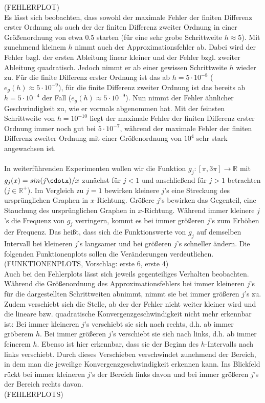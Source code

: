 \documentclass{scrartcl}
\begin{document}
(FEHLERPLOT) \\
Es lässt sich beobachten, dass sowohl der maximale Fehler der finiten Differenz erster Ordnung als auch der der finiten Differenz zweiter Ordnung in einer Größenordnung von etwa $0.5$ starten (für eine sehr grobe Schrittweite $h \approx 5$). Mit zunehmend kleinem $h$ nimmt auch der Approximationsfehler ab. Dabei wird der Fehler bzgl. der ersten Ableitung linear kleiner und der Fehler bzgl. zweiter Ableitung quadratisch. Jedoch nimmt er ab einer gewissen Schrittweite $h$ wieder zu. Für die finite Differenz erster Ordnung ist das ab $h = 5\cdot10^{-8}$ ($e_g(h) \approx  5 \cdot 10^{-9}$), für die finite Differenz zweiter Ordnung ist das bereits ab $h = 5 \cdot 10^{-4}$ der Fall ($e_g(h) \approx  5 \cdot 10^{-9}$). Nun nimmt der Fehler ähnlicher Geschwindigkeit zu, wie er vormals abgenommen hat. Mit der feinsten Schrittweite von $h = 10^{-10}$ liegt der maximale Fehler der finiten Differenz erster Ordnung immer noch gut bei $5 \cdot 10^{-7}$, während der maximale Fehler der finiten Differenz zweiter Ordnung mit einer Größenordnung von $10^{4}$ sehr stark angewachsen ist. \\
 \\
In weiterführenden Experimenten wollen wir die Funktion $g_j:[\pi, 3\pi] \rightarrow \mathbb{R}$ mit $g_j(x) = sin(j\cdotx)/x$ zunächst für $j<1$ und anschließend für $j>1$ betrachten ($j \in \mathbb{R^{+}}$). Im Vergleich zu $j = 1$ bewirken kleinere $j$'s eine Streckung des ursprünglichen Graphen in $x$-Richtung. Größere $j$'s bewirken das Gegenteil, eine Stauchung des ursprünglichen Graphen in $x$-Richtung. Während immer kleinere $j$'s die Frequenz von $g_j$ verringern, kommt es bei immer größeren $j$'s zum Erhöhen der Frequenz. Das heißt, dass sich die Funktionswerte von $g_j$ auf demselben Intervall bei kleineren $j$'s langsamer und bei größeren $j$'s schneller ändern. Die folgenden Funktionenplots sollen die Veränderungen verdeutlichen. \\
(FUNKTIONENPLOTS, Vorschlag: erste 6, erste 4) \\
Auch bei den Fehlerplots lässt sich jeweils gegenteiliges Verhalten beobachten. Während die Größenordnung des Approximationsfehlers bei immer kleineren $j$'s für die dargestellten Schrittweiten abnimmt, nimmt sie bei immer größeren $j$'s zu. Zudem verschiebt sich die Stelle, ab der der Fehler nicht weiter kleiner wird und die lineare bzw. quadratische Konvergenzgeschwindigkeit nicht mehr erkennbar ist: Bei immer kleineren $j$'s verschiebt sie sich nach rechts, d.h. ab immer gröberem $h$. Bei immer größeren $j$'s verschiebt sie sich nach links, d.h. ab immer feinerem $h$. Ebenso ist hier erkennbar, dass sie der Beginn des $h$-Intervalls nach links verschiebt. Durch dieses Verschieben verschwindet zunehmend der Bereich, in dem man die jeweilige Konvergenzgeschwindigkeit erkennen kann. Ins Blickfeld rückt bei immer kleineren $j$'s der Bereich links davon und bei immer größeren $j$'s der Bereich rechts davon. \\
(FEHLERPLOTS) \\
\end{document}
